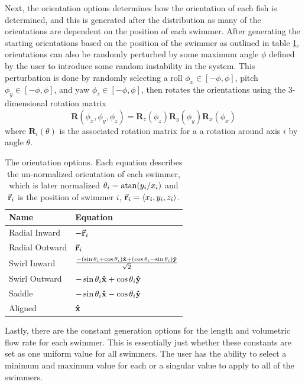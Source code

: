 \documentclass[letterpaper, 10pt, twoside]{LTJournalArticle}
\begin{document}
Next, the orientation options determines how the orientation of each fish is
determined, and this is generated after the distribution as many of the
orientations are dependent on the position of each swimmer. After generating
the starting orientations based on the position of the swimmer as outlined in
table \ref{tbl-orientation-options}, orientations can also be randomly
perturbed by some maximum angle $\phi$ defined by the user to introduce some
random instability in the system. This perturbation is done by randomly
selecting a roll $\phi_x \in [-\phi, \phi]$, pitch $\phi_y \in [-\phi, \phi]$,
and yaw $\phi_z \in [-\phi, \phi]$, then rotates the orientations using the
3-dimensional rotation matrix
\begin{equation}\label{eq:rotation-matrix}
  \mathbf{R}(\phi_x, \phi_y, \phi_z) =
  \mathbf{R}_z(\phi_z) \mathbf{R}_y(\phi_y) \mathbf{R}_x(\phi_x)
\end{equation}
where $\mathbf{R}_i(\theta)$ is the associated rotation matrix for a a rotation
around axis $i$ by angle $\theta$.

\begin{table}[htbp]
\centering
\begin{tabular}{ll}
\textbf{Name}  & \textbf{Equation} \\ \hline
Radial Inward  & $-\va{r}_i$ \\
Radial Outward & $\va{r}_i$ \\
Swirl Inward   & \(\frac{-(\sin \theta_i + \cos \theta_i) \vu{x} +
  (\cos \theta_i - \sin \theta_i) \vu{y} }{\sqrt{2}} \) \\
Swirl Outward  & $-\sin \theta_i \vu{x} + \cos \theta_i \vu{y}$ \\
Saddle         & $-\sin \theta_i \vu{x} - \cos \theta_i \vu{y}$ \\
Aligned        & $\vu{x}$
\end{tabular}
\caption{The orientation options. Each equation describes the un-normalized
  orientation of each swimmer, which is later normalized
  $\theta_i = \atan(y_i/x_i)$ and $\va{r}_i$
  is the position of swimmer $i$, $\va{r}_i = \langle x_i, y_i, z_i \rangle$.
}
\label{tbl-orientation-options}
\end{table}

Lastly, there are the constant generation options for the length and volumetric
flow rate for each swimmer. This is essentially just whether these constants are
set as one uniform value for all swimmers. The user has the ability to select
a minimum and maximum value for each or a singular value to apply to all of the
swimmers.
\end{document}

